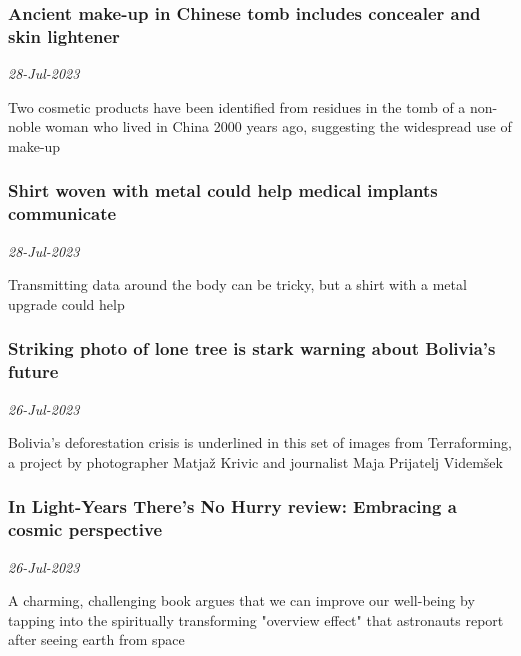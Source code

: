 \subsubsection{Ancient make-up in Chinese tomb includes concealer and skin lightener \href{https://www.newscientist.com/article/2384091-ancient-make-up-in-chinese-tomb-includes-concealer-and-skin-lightener/?utm_campaign=RSS%7CNSNS&utm_source=NSNS&utm_medium=RSS&utm_content=home}{}}
\textit{28-Jul-2023}

Two cosmetic products have been identified from residues in the tomb of a non-noble woman who lived in China 2000 years ago, suggesting the widespread use of make-up
\subsubsection{Shirt woven with metal could help medical implants communicate \href{https://www.newscientist.com/article/2384486-shirt-woven-with-metal-could-help-medical-implants-communicate/?utm_campaign=RSS%7CNSNS&utm_source=NSNS&utm_medium=RSS&utm_content=home}{\ding{225}}}
\textit{28-Jul-2023}

Transmitting data around the body can be tricky, but a shirt with a metal upgrade could help
\subsubsection{Striking photo of lone tree is stark warning about Bolivia’s future \href{https://www.newscientist.com/article/mg25934490-800-striking-photo-of-lone-tree-is-stark-warning-about-bolivias-future/?utm_campaign=RSS%7CNSNS&utm_source=NSNS&utm_medium=RSS&utm_content=home}{}}
\textit{26-Jul-2023}

Bolivia's deforestation crisis is underlined in this set of images from Terraforming, a project by photographer Matjaž Krivic and journalist Maja Prijatelj Videmšek
\subsubsection{In Light-Years There's No Hurry review: Embracing a cosmic perspective \href{https://www.newscientist.com/article/mg25934491-000-in-light-years-theres-no-hurry-review-embracing-a-cosmic-perspective/?utm_campaign=RSS%7CNSNS&utm_source=NSNS&utm_medium=RSS&utm_content=home}{\ding{225}}}
\textit{26-Jul-2023}

A charming, challenging book argues that we can improve our well-being by tapping into the spiritually transforming "overview effect" that astronauts report after seeing earth from space
